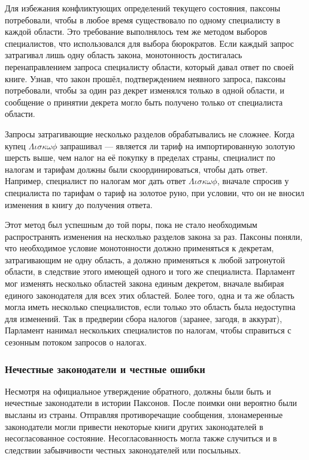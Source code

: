 \documentclass[12pt, a4paper]{article} %
\begin{document}
Для избежания конфликтующих определений текущего состояния, паксоны потребовали, чтобы в любое время существовало по одному специалисту в каждой области. Это требование выполнялось тем же методом выборов специалистов, что использовался для выбора бюрократов. Если каждый запрос затрагивал лишь одну область закона, монотонность достигалась перенаправлением запроса специалисту области, который давал ответ по своей книге. Узнав, что закон прошёл, подтверждением неявного запроса, паксоны потребовали, чтобы за один раз декрет изменялся только в одной области, и сообщение о принятии декрета могло быть получено только от специалиста области.

Запросы затрагивающие несколько разделов обрабатывались не сложнее. Когда купец $\Lambda\iota\sigma\kappa\omega\phi$ запрашивал --- является ли тариф на импортированную золотую шерсть выше, чем налог на её покупку в пределах страны, специалист по налогам и тарифам должны были скоординироваться, чтобы дать ответ. Например, специалист по налогам мог дать ответ $\Lambda\iota\sigma\kappa\omega\phi$, вначале спросив у специалиста по тарифам о тариф на золотое руно, при условии, что он не вносил изменения в книгу до получения ответа.

Этот метод был успешным до той поры, пока не стало необходимым распространять изменения на несколько разделов закона за раз. Паксоны поняли, что необходимое условие монотонности должно применяться к декретам, затрагивающим не одну область, а  должно применяться к любой затронутой области, в следствие этого имеющей одного и того же специалиста. Парламент мог изменять несколько областей закона единым декретом, вначале выбирая единого законодателя для всех этих областей. Более того, одна и та же область могла иметь несколько специалистов, если только это область была недоступна для изменений. Так в предверии сбора налогов (заранее, загодя, в аккурат), Парламент нанимал нескольких специалистов по налогам, чтобы справиться с сезонным потоком запросов о налогах.

\subsubsection{Нечестные законодатели и честные ошибки}\label{sec:evilorholy}

Несмотря на официальное утверждение обратного, должны были быть и нечестные законодатели в истории Паксонов. После поимки они вероятно были высланы из страны. Отправляя противоречащие сообщения, злонамеренные законодатели могли привести некоторые книги других законодателей в несогласованное состояние. Несогласованность могла также случиться и в следствии забывчивости честных законодателей или посыльных.
\end{document}
